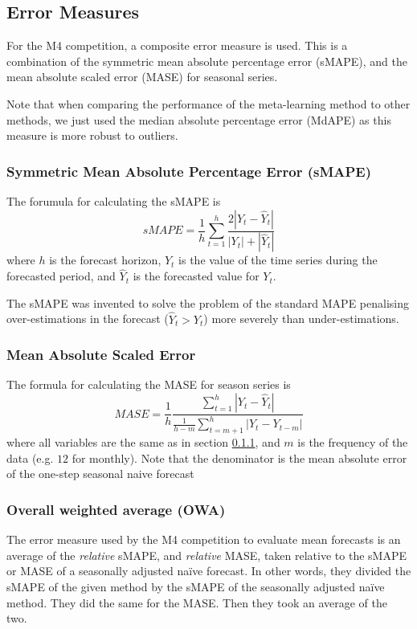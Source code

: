\documentclass[a4paper,12pt]{article}
\theoremstyle{definition}
\begin{document}
\subsection{Error Measures}
For the M4 competition, a composite error measure is used. This is a combination of the symmetric mean absolute percentage error (sMAPE), and the mean absolute scaled error (MASE) for seasonal series.

Note that when comparing the performance of the meta-learning method to other methods, we just used the median absolute percentage error (MdAPE) as this measure is more robust to outliers.

\subsubsection{Symmetric Mean Absolute Percentage Error (sMAPE)}\label{sec:smape}
The forumula for calculating the sMAPE is
\begin{equation}
	sMAPE = \frac{1}{h}\sum_{t=1}^{h}\frac{2 |Y_t - \hat{Y}_t|}{|Y_t| + |\hat{Y}_t|}
\end{equation}
where $h$ is the forecast horizon, $Y_t$ is the value of the time series during the forecasted period, and $\hat{Y}_t$ is the forecasted value for $Y_t$. 

The sMAPE was invented to solve the problem of the standard MAPE penalising over-estimations in the forecast ($\hat{Y}_t > Y_t$) more severely than under-estimations.

\subsubsection{Mean Absolute Scaled Error}
The formula for calculating the MASE for season series is
\begin{equation}
	MASE = \frac{1}{h} \frac{\sum_{t=1}^{h}|Y_t - \hat{Y}_t|}{\frac{1}{h-m}\sum_{t=m+1}^{h}|Y_t - Y_{t-m}|}
\end{equation}
where all variables are the same as in section \ref{sec:smape}, and $m$ is the frequency of the data (e.g. $12$ for monthly). Note that the denominator is the mean absolute error of the one-step seasonal naive forecast

\subsubsection{Overall weighted average (OWA)}
The error measure used by the M4 competition to evaluate mean forecasts is an average of the \textit{relative} sMAPE, and \textit{relative} MASE, taken relative to the sMAPE or MASE of a seasonally adjusted na{\"i}ve forecast. In other words, they divided the sMAPE of the given method by the sMAPE of the seasonally adjusted na{\"i}ve method. They did the same for the MASE. Then they took an average of the two.
\end{document}

